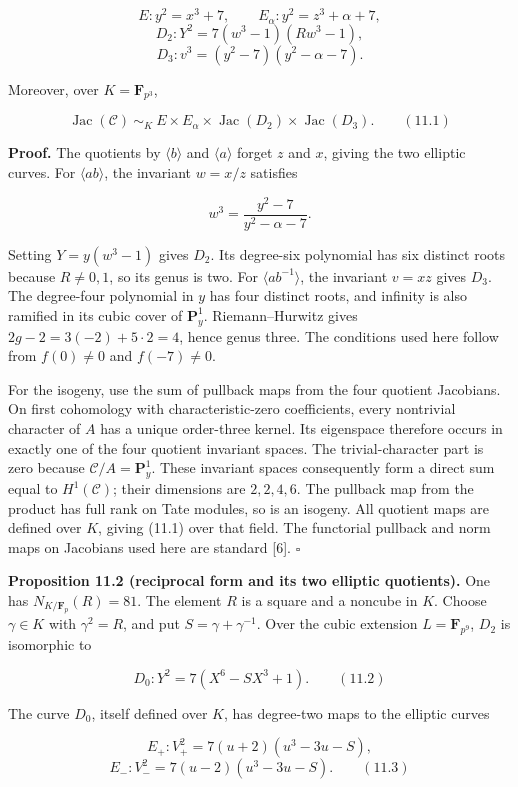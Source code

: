 \documentclass[
  11pt,
  a4paper,
]{article}
\begin{document}
\[
E:y^2=x^3+7,\qquad E_\alpha:y^2=z^3+\alpha+7,
\] \[
D_2:Y^2=7(w^3-1)(Rw^3-1),
\] \[
D_3:v^3=(y^2-7)(y^2-\alpha-7).
\]

Moreover, over \(K=\mathbf F_{p^3}\),

\[
\operatorname{Jac}(\mathcal C)\ \sim_K\
E\times E_\alpha\times\operatorname{Jac}(D_2)\times\operatorname{Jac}(D_3). \qquad (11.1)
\]

\textbf{Proof.} The quotients by \(\langle b\rangle\) and
\(\langle a\rangle\) forget \(z\) and \(x\), giving the two elliptic
curves. For \(\langle ab\rangle\), the invariant \(w=x/z\) satisfies

\[
w^3=\frac{y^2-7}{y^2-\alpha-7}.
\]

Setting \(Y=y(w^3-1)\) gives \(D_2\). Its degree-six polynomial has six
distinct roots because \(R\neq0,1\), so its genus is two. For
\(\langle ab^{-1}\rangle\), the invariant \(v=xz\) gives \(D_3\). The
degree-four polynomial in \(y\) has four distinct roots, and infinity is
also ramified in its cubic cover of \(\mathbf P^1_y\). Riemann--Hurwitz
gives \(2g-2=3(-2)+5\cdot2=4\), hence genus three. The conditions used
here follow from \(f(0)\neq0\) and \(f(-7)\neq0\).

For the isogeny, use the sum of pullback maps from the four quotient
Jacobians. On first cohomology with characteristic-zero coefficients,
every nontrivial character of \(A\) has a unique order-three kernel. Its
eigenspace therefore occurs in exactly one of the four quotient
invariant spaces. The trivial-character part is zero because
\(\mathcal C/A=\mathbf P^1_y\). These invariant spaces consequently form
a direct sum equal to \(H^1(\mathcal C)\); their dimensions are
\(2,2,4,6\). The pullback map from the product has full rank on Tate
modules, so is an isogeny. All quotient maps are defined over \(K\),
giving (11.1) over that field. The functorial pullback and norm maps on
Jacobians used here are standard {[}6{]}. \(\square\)

\textbf{Proposition 11.2 (reciprocal form and its two elliptic
quotients).} One has \(N_{K/\mathbf F_p}(R)=81\). The element \(R\) is a
square and a noncube in \(K\). Choose \(\gamma\in K\) with
\(\gamma^2=R\), and put \(S=\gamma+\gamma^{-1}\). Over the cubic
extension \(L=\mathbf F_{p^9}\), \(D_2\) is isomorphic to

\[
D_0:Y^2=7(X^6-SX^3+1). \qquad (11.2)
\]

The curve \(D_0\), itself defined over \(K\), has degree-two maps to the
elliptic curves

\[
E_+:V_+^2=7(u+2)(u^3-3u-S),
\] \[
E_-:V_-^2=7(u-2)(u^3-3u-S). \qquad (11.3)
\]
\end{document}
